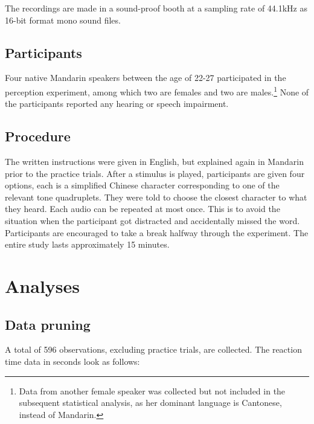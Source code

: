 \documentclass[12pt,letterpaper]{scrartcl}
\begin{document}
The recordings are made  in a sound-proof booth at a sampling rate of 44.1kHz as 16-bit format mono sound files.


\subsection{Participants}

Four native Mandarin speakers between the age of 22-27 participated in the perception experiment, among which two are females and two are males.\footnote{Data from another female speaker was collected but not included in the subsequent statistical analysis, as her dominant language is Cantonese, instead of Mandarin.} None of the participants reported any hearing or speech impairment.

\subsection{Procedure}

The written instructions were given in English, but explained again in Mandarin prior to the practice trials. After a stimulus is played, participants are given four options, each is a simplified Chinese character corresponding to one of the relevant tone quadruplets. They were told to choose the closest character to what they heard. Each audio can be repeated at most once. This is to avoid the situation when the participant got distracted and accidentally missed the word. Participants are encouraged to take a break halfway through the experiment. The entire study lasts approximately 15 minutes.

\section{Analyses}

\subsection{Data pruning}

A total of 596 observations, excluding practice trials, are collected. The reaction time data in seconds look as follows:
\end{document}
